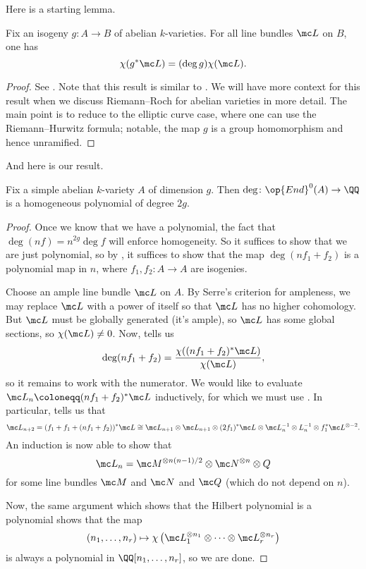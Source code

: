 \documentclass[../notes.tex]{subfiles}
\begin{document}
Here is a starting lemma.
\begin{lemma} \label{lem:deg-by-euler-char}
	Fix an isogeny $g\colon A\to B$ of abelian $k$-varieties. For all line bundles $\mc L$ on $B$, one has
	\[\chi(g^*\mc L)=(\deg g)\chi(\mc L).\]
\end{lemma}
\begin{proof}
	See \cite[Theorem~12.2]{mumford}. Note that this result is similar to . We will have more context for this result when we discuss Riemann--Roch for abelian varieties in more detail. The main point is to reduce to the elliptic curve case, where one can use the Riemann--Hurwitz formula; notable, the map $g$ is a group homomorphism and hence unramified.
\end{proof}
And here is our result.
\begin{theorem}
	Fix a simple abelian $k$-variety $A$ of dimension $g$. Then $\deg\colon\op{End}^0(A)\to\QQ$ is a homogeneous polynomial of degree $2g$.
\end{theorem}
\begin{proof}
	Once we know that we have a polynomial, the fact that $\deg(nf)=n^{2g}\deg f$ will enforce homogeneity. So it suffices to show that we are just polynomial, so by , it suffices to show that the map $\deg(nf_1+f_2)$ is a polynomial map in $n$, where $f_1,f_2\colon A\to A$ are isogenies.

	Choose an ample line bundle $\mc L$ on $A$. By Serre's criterion for ampleness, we may replace $\mc L$ with a power of itself so that $\mc L$ has no higher cohomology. But $\mc L$ must be globally generated (it's ample), so $\mc L$ has some global sections, so $\chi(\mc L)\ne0$. Now,  tells us
	\[\deg(nf_1+f_2)=\frac{\chi((nf_1+f_2)^*\mc L)}{\chi(\mc L)},\]
	so it remains to work with the numerator. We would like to evaluate $\mc L_n\coloneqq (nf_1+f_2)^*\mc L$ inductively, for which we must use . In particular,  tells us that
	\[\mc L_{n+2}=(f_1+f_1+(nf_1+f_2))^*\mc L\cong\mc L_{n+1}\otimes\mc L_{n+1}\otimes(2f_1)^*\mc L\otimes\mc L_n^{-1}\otimes L_n^{-1}\otimes f_1^*\mc L^{\otimes-2}.\]
	An induction is now able to show that
	\[\mc L_n=\mc M^{\otimes n(n-1)/2}\otimes\mc N^{\otimes n}\otimes Q\]
	for some line bundles $\mc M$ and $\mc N$ and $\mc Q$ (which do not depend on $n$).

	Now, the same argument which shows that the Hilbert polynomial is a polynomial shows that the map
	\[(n_1,\ldots,n_r)\mapsto\chi\left(\mc L_1^{\otimes n_1}\otimes\cdots\otimes\mc L_r^{\otimes n_r}\right)\]
	is always a polynomial in $\QQ[n_1,\ldots,n_r]$, so we are done.
\end{proof}
\end{document}
